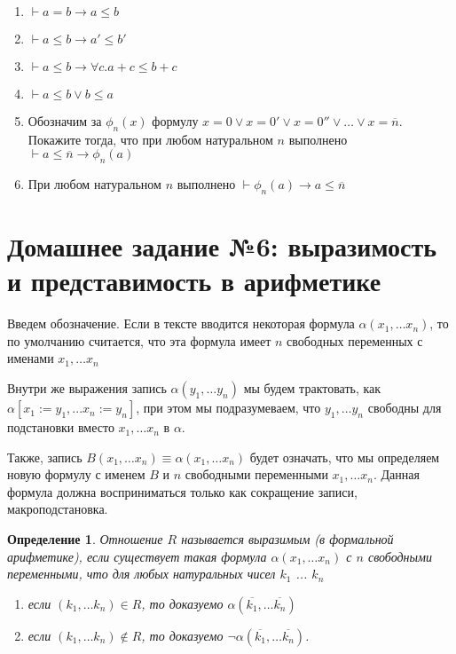 \documentclass[10pt,a4paper,oneside]{article}
\newtheorem{definition}{Определение}
\begin{document}
\begin{enumerate}
\begin{enumerate}
\item $\vdash a = b \rightarrow a \le b$
\item $\vdash a \le b \rightarrow a' \le b'$
\item $\vdash a \le b \rightarrow \forall c.a + c \le b + c$
\item $\vdash a \le b \vee b \le a$
\item Обозначим за $\phi_n(x)$ формулу $x = 0 \vee x = 0' \vee x = 0'' \vee \dots \vee x = \overline{n}$.
Покажите тогда, что при любом натуральном $n$ выполнено $\vdash a \le \overline{n} \rightarrow \phi_n(a)$
\item При любом натуральном $n$ выполнено $\vdash \phi_n(a) \rightarrow a \le \overline{n}$
\end{enumerate}
\end{enumerate}

\section*{Домашнее задание №6: выразимость и представимость в арифметике}

Введем обозначение. Если в тексте вводится некоторая формула $\alpha(x_1, \dots x_n)$, то
по умолчанию считается, что эта формула имеет $n$ свободных переменных с именами
$x_1, \dots x_n$

Внутри же выражения запись $\alpha (y_1, \dots y_n)$ мы будем трактовать, как 
$\alpha [x_1 := y_1, ... x_n := y_n]$, при этом
мы подразумеваем, что $y_1, \dots y_n$ свободны для подстановки вместо $x_1, \dots x_n$ в $\alpha$.

Также, запись $B(x_1, \dots x_n) \equiv \alpha(x_1, \dots x_n)$ будет означать, что мы определяем
новую формулу с именем $B$ и $n$ свободными переменными $x_1, \dots x_n$. 
Данная формула должна восприниматься только как сокращение записи, макроподстановка.

\begin{definition}
Отношение $R$ называется выразимым (в формальной арифметике), если 
существует такая формула $\alpha (x_1, \dots x_n)$ с $n$ свободными переменными, 
что для любых натуральных чисел $k_1$ ... $k_n$
\begin{enumerate}
\item если $(k_1, \dots k_n) \in R$, то доказуемо $\alpha (\overline{k_1}, \dots \overline{k_n})$
\item если $(k_1, \dots k_n) \notin R $, то доказуемо $\neg \alpha (\overline{k_1}, \dots \overline{k_n})$.
\end{enumerate}
\end{definition}
\end{document}
